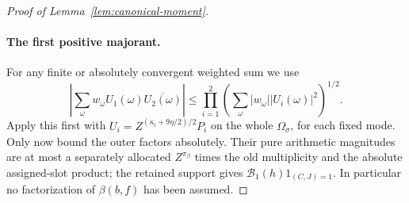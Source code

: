 \documentclass[11pt,a4paper]{article}
\numberwithin{equation}{section}
\numberwithin{figure}{section}
\theoremstyle{definition}
\theoremstyle{remark}
\begin{document}
\begin{proof}[Proof of Lemma~\ref{lem:canonical-moment}]
\paragraph{The first positive majorant.}
For any finite or absolutely convergent weighted sum we use
\begin{equation}\tag{D}\label{eq:weighted-cauchy}
 \left|\sum_\omega w_\omega U_1(\omega)\overline{U_2(\omega)}\right|
 \le\prod_{i=1}^2
       \left(\sum_\omega|w_\omega||U_i(\omega)|^2\right)^{1/2}.
\end{equation}
Apply this first with \(U_i=Z^{(\kappa_i+9\eta/2)/2}P_i\) on the whole
\(\Omega_\sigma\), for each fixed mode.  Only now bound the outer
factors absolutely.  Their pure arithmetic magnitudes are at most a
separately allocated \(Z^{\pi_\beta}\) times the old multiplicity and
the absolute assigned-slot product; the retained support gives
\(\mathcal B_1(h)1_{(C,J)=1}\).  In particular no factorization of
\(\beta(b,f)\) has been assumed.


\end{proof}
\end{document}
